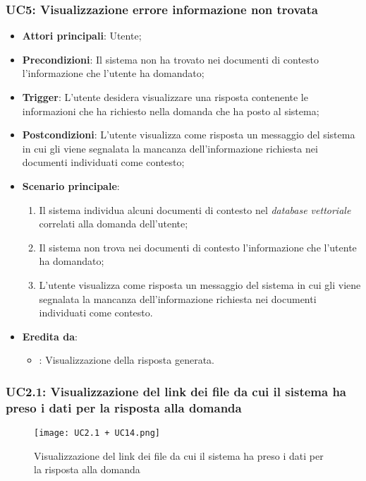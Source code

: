 \subsubsection{UC5: Visualizzazione errore informazione non trovata}
\begin{itemize}
    \item \textbf{Attori principali}: Utente;
    \item \textbf{Precondizioni}: Il sistema non ha trovato nei documenti di contesto l'informazione che l'utente ha domandato;
    \item \textbf{Trigger}: L'utente desidera visualizzare una risposta contenente le informazioni che ha richiesto nella domanda che ha posto al sistema;
    \item \textbf{Postcondizioni}: L'utente visualizza come risposta un messaggio del sistema in cui gli viene segnalata la mancanza dell'informazione 
    richiesta nei documenti individuati come contesto;
    \item \textbf{Scenario principale}:
    \begin{enumerate}
        \item Il sistema individua alcuni documenti di contesto nel \emph{database vettoriale} correlati alla domanda dell'utente;
        \item Il sistema non trova nei documenti di contesto l'informazione che l'utente ha domandato;
        \item L'utente visualizza come risposta un messaggio del sistema in cui gli viene segnalata la mancanza dell'informazione richiesta
        nei documenti individuati come contesto.
    \end{enumerate}
    \item \textbf{Eredita da}:
    \begin{itemize}
        \item {}: Visualizzazione della risposta generata.
    \end{itemize}
\end{itemize}

\newpage

\hypertarget{UC2.1}{}
\subsubsection{UC2.1: Visualizzazione del link dei file da cui il sistema ha preso i dati per la risposta alla domanda}

\begin{figure}[h]
    \centering
    \texttt{[image: UC2.1 + UC14.png]}
    \caption{Visualizzazione del link dei file da cui il sistema ha preso i dati per la risposta alla domanda}
\end{figure}

